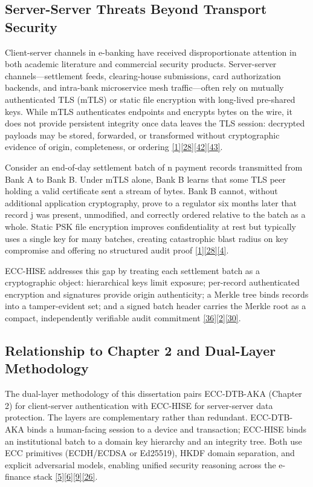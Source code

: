 \subsection{Server-Server Threats Beyond Transport Security}

\indent Client-server channels in e-banking have received disproportionate attention in both academic literature and commercial security products. Server-server channels---settlement feeds, clearing-house submissions, card authorization backends, and intra-bank microservice mesh traffic---often rely on mutually authenticated TLS (mTLS) or static file encryption with long-lived pre-shared keys. While mTLS authenticates endpoints and encrypts bytes on the wire, it does not provide persistent integrity once data leaves the TLS session: decrypted payloads may be stored, forwarded, or transformed without cryptographic evidence of origin, completeness, or ordering \hyperref[ref:1]{[1]}\hyperref[ref:28]{[28]}\hyperref[ref:42]{[42]}\hyperref[ref:43]{[43]}.

\indent Consider an end-of-day settlement batch of n payment records transmitted from Bank A to Bank B. Under mTLS alone, Bank B learns that some TLS peer holding a valid certificate sent a stream of bytes. Bank B cannot, without additional application cryptography, prove to a regulator six months later that record j was present, unmodified, and correctly ordered relative to the batch as a whole. Static PSK file encryption improves confidentiality at rest but typically uses a single key for many batches, creating catastrophic blast radius on key compromise and offering no structured audit proof \hyperref[ref:1]{[1]}\hyperref[ref:28]{[28]}\hyperref[ref:4]{[4]}.

\indent ECC-HISE addresses this gap by treating each settlement batch as a cryptographic object: hierarchical keys limit exposure; per-record authenticated encryption and signatures provide origin authenticity; a Merkle tree binds records into a tamper-evident set; and a signed batch header carries the Merkle root as a compact, independently verifiable audit commitment \hyperref[ref:36]{[36]}\hyperref[ref:2]{[2]}\hyperref[ref:30]{[30]}.

\subsection{Relationship to Chapter 2 and Dual-Layer Methodology}

\indent The dual-layer methodology of this dissertation pairs ECC-DTB-AKA (Chapter 2) for client-server authentication with ECC-HISE for server-server data protection. The layers are complementary rather than redundant. ECC-DTB-AKA binds a human-facing session to a device and transaction; ECC-HISE binds an institutional batch to a domain key hierarchy and an integrity tree. Both use ECC primitives (ECDH/ECDSA or Ed25519), HKDF domain separation, and explicit adversarial models, enabling unified security reasoning across the e-finance stack \hyperref[ref:5]{[5]}\hyperref[ref:6]{[6]}\hyperref[ref:9]{[9]}\hyperref[ref:26]{[26]}.

